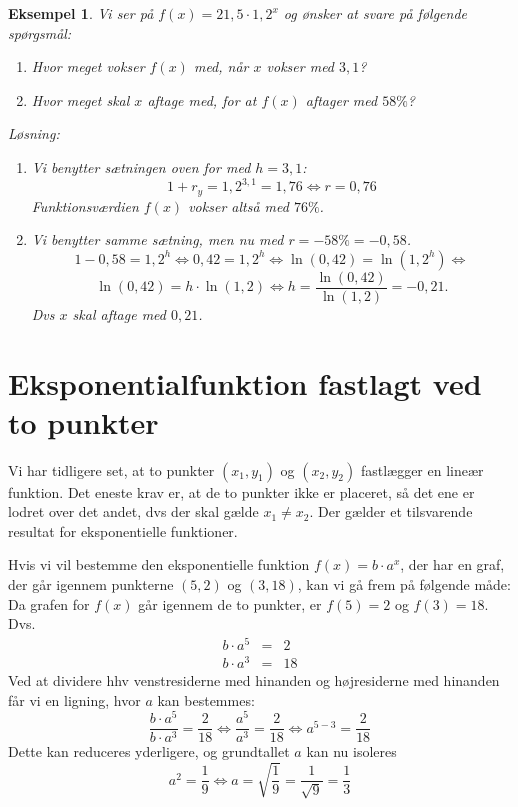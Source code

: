 \documentclass[12pt,oneside,a4paper]{article}
\newcommand{\bas}{\begin{eqnarray*}}
\newcommand{\eas}{\end{eqnarray*}}
\newtheorem{eks}[thm]{Eksempel}
\begin{document}
\begin{eks}
    Vi ser på $f(x) = 21,5 \cdot 1,2^x$ og ønsker at svare på følgende spørgsmål:
    \begin{enumerate}
        \item Hvor meget vokser $f(x)$ med, når $x$ vokser med $3,1$?
        \item Hvor meget skal $x$ aftage med, for at $f(x)$ aftager med $58\%$?
    \end{enumerate}

    Løsning:
    \begin{enumerate}
        \item Vi benytter sætningen oven for med $h=3,1$:
            $$
            1+r_y = 1,2^{3,1} = 1,76 \Leftrightarrow r = 0,76
            $$
            Funktionsværdien $f(x)$ vokser altså med $76\%$.
        \item Vi benytter samme sætning, men nu med $r = -58\% = -0,58$.
            $$
            1-0,58 = 1,2^h \Leftrightarrow 0,42 = 1,2^h \Leftrightarrow \ln(0,42) = \ln(1,2^h) \Leftrightarrow
            $$
            $$
            \ln(0,42) = h\cdot \ln(1,2) \Leftrightarrow h = \frac{\ln(0,42)}{\ln(1,2)} = -0,21.
            $$
            Dvs $x$ skal aftage med $0,21$.
    \end{enumerate}
\end{eks}

\section{Eksponentialfunktion fastlagt ved to punkter}
Vi har tidligere set, at to punkter $(x_1,y_1)$ og $(x_2, y_2)$ fastlægger en
lineær funktion. Det eneste krav er, at de to punkter ikke er placeret, så det
ene er lodret over det andet, dvs der skal gælde $x_1 \neq x_2$. Der gælder et
tilsvarende resultat for eksponentielle funktioner.

Hvis vi vil bestemme den eksponentielle funktion $f(x) = b\cdot a^x$, der har en
graf, der går igennem punkterne $(5, 2)$ og $(3, 18)$, kan vi gå frem på
følgende måde:
Da grafen for $f(x)$ går igennem de to punkter, er $f(5) = 2$ og $f(3) = 18$. Dvs.
\bas
b \cdot a^5  &=& 2\\
b \cdot a^3  &=& 18
\eas
Ved at dividere hhv venstresiderne med hinanden og højresiderne med hinanden får vi en ligning,
hvor $a$ kan bestemmes:
$$
\frac{b\cdot a^5}{b\cdot a^3} = \frac{2}{18} \Leftrightarrow 
\frac{a^5}{a^3} = \frac{2}{18} \Leftrightarrow 
a^{5-3} = \frac{2}{18}  
$$
Dette kan reduceres yderligere, og grundtallet $a$ kan nu isoleres
$$
a^2 = \frac{1}{9} \Leftrightarrow a = \sqrt{\frac{1}{9}} = \frac{1}{\sqrt{9}} = \frac{1}{3}
$$
\end{document}
